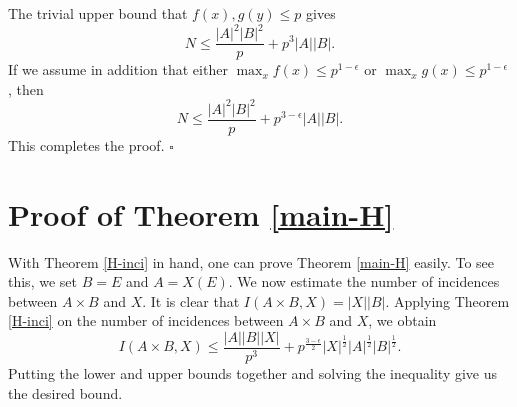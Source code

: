 \documentclass[11pt]{article}
\newtheorem{conjecture}[theorem]{Conjecture}
\begin{document}
The trivial upper bound that $f(x), g(y)\le p$ gives 
\[N\le \frac{|A|^2|B|^2}{p}+p^3|A||B|.\]
If we assume in addition that either $\max_{x}f(x)\le p^{1-\epsilon}$ or $\max_{x}g(x)\le p^{1-\epsilon}$, then 
\[N\le \frac{|A|^2|B|^2}{p}+p^{3-\epsilon}|A||B|.\]
This completes the proof. $\square$







\section{Proof of Theorem \ref{main-H}}
With Theorem \ref{H-inci} in hand, one can prove Theorem \ref{main-H} easily. To see this, we set $B=E$ and $A=X(E)$. We now estimate the number of incidences between $A\times B$ and $X$. It is clear that $I(A\times B, X)=|X||B|$. Applying Theorem \ref{H-inci} on the number of incidences between $A\times B$ and $X$, we obtain 
\[I(A\times B, X)\le \frac{|A||B||X|}{p^3}+p^{\frac{3-\epsilon}{2}}|X|^{\frac{1}{2}}|A|^{\frac{1}{2}}|B|^{\frac{1}{2}}.\]
Putting the lower and upper bounds together and solving the inequality give us the desired bound. 

\end{document}
